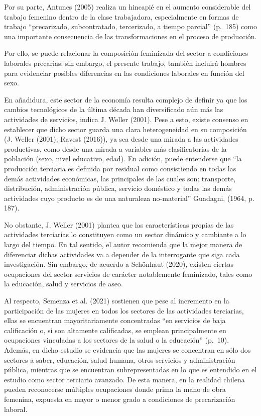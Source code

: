 \documentclass[
]{article}
\begin{document}
Por su parte, Antunes (2005) realiza un hincapié en el aumento
considerable del trabajo femenino dentro de la clase trabajadora,
especialmente en formas de trabajo ``precarizado, subcontratado,
tercerizado, a tiempo parcial'' (p.~185) como una importante
consecuencia de las transformaciones en el proceso de producción.

Por ello, se puede relacionar la composición feminizada del sector a
condiciones laborales precarias; sin embargo, el presente trabajo,
también incluirá hombres para evidenciar posibles diferencias en las
condiciones laborales en función del sexo.

En añadidura, este sector de la economía resulta complejo de definir ya
que los cambios tecnológicos de la última década han diversificado aún
más las actividades de servicios, indica J. Weller (2001). Pese a esto,
existe consenso en establecer que dicho sector guarda una clara
heterogeneidad en su composición (J. Weller (2001); Ravest (2016)), ya
sea desde una mirada a las actividades productivas, como desde una
mirada a variables más clasificatorias de la población (sexo, nivel
educativo, edad). En adición, puede entenderse que ``la producción
terciaria es definida por residual como consistiendo en todas las demás
actividades económicas, las principales de las cuales son: transporte,
distribución, administración pública, servicio doméstico y todas las
demás actividades cuyo producto es de una naturaleza no-material''
Guadagni, (1964, p. 187).

No obstante, J. Weller (2001) plantea que las características propias de
las actividades terciarias lo constituyen como un sector dinámico y
cambiante a lo largo del tiempo. En tal sentido, el autor recomienda que
la mejor manera de diferenciar dichas actividades va a depender de la
interrogante que siga cada investigación. Sin embargo, de acuerdo a
Schönhaut (2020), existen ciertas ocupaciones del sector servicios de
carácter notablemente feminizado, tales como la educación, salud y
servicios de aseo.

Al respecto, Semenza et al. (2021) sostienen que pese al incremento en
la participación de las mujeres en todos los sectores de las actividades
terciarias, ellas se encuentran mayoritariamente concentradas ``en
servicios de baja calificación o, si son altamente calificadas, se
emplean principalmente en ocupaciones vinculadas a los sectores de la
salud o la educación'' (p.~10). Además, en dicho estudio se evidencia
que las mujeres se concentran en sólo dos sectores a saber, educación,
salud humana, otros servicios y administración pública, mientras que se
encuentran subrepresentadas en lo que es entendido en el estudio como
sector terciario avanzado. De esta manera, en la realidad chilena pueden
reconocerse múltiples ocupaciones donde prima la mano de obra femenina,
expuesta en mayor o menor grado a condiciones de precarización laboral.
\end{document}
